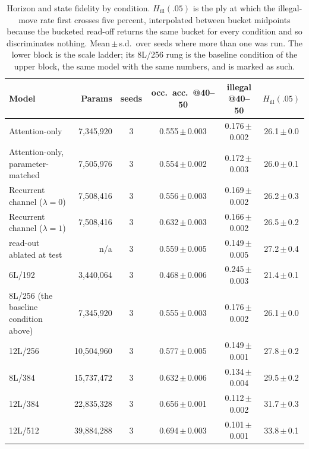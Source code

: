 \begin{table}[t]
\centering\small
\caption{Horizon and state fidelity by condition. $H_{\mathrm{ill}}(.05)$ is
the ply at which the illegal-move rate first crosses five percent,
interpolated between bucket midpoints because the bucketed read-off returns
the same bucket for every condition and so discriminates nothing.
Mean\,$\pm$\,s.d.\ over seeds where more than one was run. The lower
block is the scale ladder; its 8L/256 rung is the baseline condition of the
upper block, the same model with the same numbers, and is marked as such.}
\label{tab:horizon}
\begin{tabular}{lrcccc}
\toprule
Model & Params & seeds & occ.\ acc.\ @40--50 & illegal @40--50 & $H_{\mathrm{ill}}(.05)$ \\
\midrule
Attention-only & 7{,}345{,}920 & 3 & 0.555\,$\pm$\,0.003 & 0.176\,$\pm$\,0.002 & 26.1\,$\pm$\,0.0 \\
Attention-only, parameter-matched & 7{,}505{,}976 & 3 & 0.554\,$\pm$\,0.002 & 0.172\,$\pm$\,0.003 & 26.0\,$\pm$\,0.1 \\
Recurrent channel ($\lambda{=}0$) & 7{,}508{,}416 & 3 & 0.556\,$\pm$\,0.003 & 0.169\,$\pm$\,0.002 & 26.2\,$\pm$\,0.3 \\
Recurrent channel ($\lambda{=}1$) & 7{,}508{,}416 & 3 & 0.632\,$\pm$\,0.003 & 0.166\,$\pm$\,0.002 & 26.5\,$\pm$\,0.2 \\
\midrule
\quad read-out ablated at test & n/a & 3 & 0.559\,$\pm$\,0.005 & 0.149\,$\pm$\,0.005 & 27.2\,$\pm$\,0.4 \\
\midrule
\quad 6L/192 & 3{,}440{,}064 & 3 & 0.468\,$\pm$\,0.006 & 0.245\,$\pm$\,0.003 & 21.4\,$\pm$\,0.1 \\
\quad 8L/256 (the baseline condition above) & 7{,}345{,}920 & 3 & 0.555\,$\pm$\,0.003 & 0.176\,$\pm$\,0.002 & 26.1\,$\pm$\,0.0 \\
\quad 12L/256 & 10{,}504{,}960 & 3 & 0.577\,$\pm$\,0.005 & 0.149\,$\pm$\,0.001 & 27.8\,$\pm$\,0.2 \\
\quad 8L/384 & 15{,}737{,}472 & 3 & 0.632\,$\pm$\,0.006 & 0.134\,$\pm$\,0.004 & 29.5\,$\pm$\,0.2 \\
\quad 12L/384 & 22{,}835{,}328 & 3 & 0.656\,$\pm$\,0.001 & 0.112\,$\pm$\,0.002 & 31.7\,$\pm$\,0.3 \\
\quad 12L/512 & 39{,}884{,}288 & 3 & 0.694\,$\pm$\,0.003 & 0.101\,$\pm$\,0.001 & 33.8\,$\pm$\,0.1 \\
\bottomrule
\end{tabular}
\end{table}
